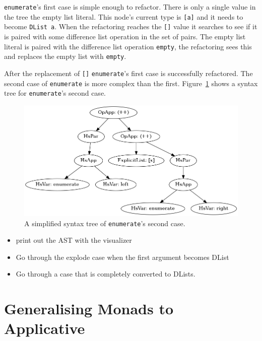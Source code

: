 \texttt{enumerate}'s first case is simple enough to refactor. There is only a single value in the tree the empty list literal. This node's current type is \texttt{[a]} and it needs to become \texttt{DList a}. When the refactoring reaches the \texttt{[]} value it searches to see if it is paired with some difference list operation in the set of pairs. The empty list literal is paired with the difference list operation \texttt{empty}, the refactoring sees this and replaces the empty list with \texttt{empty}.

After the replacement of \texttt{[]} \texttt{enumerate}'s first case is successfully refactored. The second case of \texttt{enumerate} is more complex than the first. Figure~\ref{enumAST} shows a syntax tree for \texttt{enumerate}'s second case. 

\begin{figure}[h]\label{enumAST}
	\begin{center}
		\includegraphics[scale=.5]{graphVis/enumerate.png}
	\end{center}
	\caption{A simplified syntax tree of \texttt{enumerate}'s second case.}
\end{figure}


\begin{itemize}
\item print out the AST with the visualizer
\item Go through the explode case when the first argument becomes DList
\item Go through a case that is completely converted to DLists.
\end{itemize}



\chapter{Generalising Monads to Applicative}
\label{applicative}

